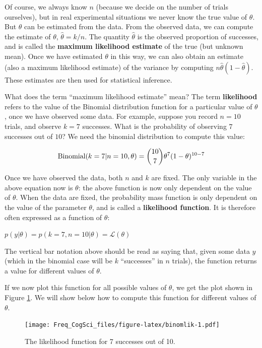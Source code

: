 \documentclass[
  12pt,
]{krantz}
\theoremstyle{definition}
\theoremstyle{definition}
\theoremstyle{definition}
\theoremstyle{definition}
\theoremstyle{remark}
\begin{document}
Of course, we always know \(n\) (because we decide on the number of trials ourselves), but in real experimental situations we never know the true value of \(\theta\). But \(\theta\) can be estimated from the data. From the observed data, we can compute the estimate of \(\theta\), \(\hat \theta=k/n\). The quantity \(\hat \theta\) is the observed proportion of successes, and is called the \textbf{maximum likelihood estimate} of the true (but unknown mean). Once we have estimated \(\theta\) in this way, we can also obtain an estimate (also a maximum likelihood estimate) of the variance by computing \(n\hat\theta (1-\hat\theta)\). These estimates are then used for statistical inference.

What does the term ``maximum likelihood estimate'' mean? The term \textbf{likelihood} refers to the value of the Binomial distribution function for a particular value of \(\theta\), once we have observed some data. For example, suppose you record \(n=10\) trials, and observe \(k=7\) successes. What is the probability of observing \(7\) successes out of \(10\)? We need the binomial distribution to compute this value:

\begin{equation}
\hbox{Binomial}(k=7|n=10,\theta) = 
\binom{10}{7} \theta^{7} (1-\theta)^{10-7}
\end{equation}

Once we have observed the data, both \(n\) and \(k\) are fixed. The only variable in the above equation now is \(\theta\): the above function is now only dependent on the value of \(\theta\). When the data are fixed, the probability mass function is only dependent on the value of the parameter \(\theta\), and is called a \textbf{likelihood function}. It is therefore often expressed as a function of \(\theta\):

\(p( y | \theta ) = p( k=7, n=10 | \theta) = \mathcal{L}(\theta)\)

The vertical bar notation above should be read as saying that, given some data \(y\) (which in the binomial case will be \(k\) ``successes'' in \(n\) trials), the function returns a value for different values of \(\theta\).

If we now plot this function for all possible values of \(\theta\), we get the plot shown in Figure \ref{fig:binomlik}. We will show below how to compute this function for different values of \(\theta\).

\begin{figure}
\centering
\texttt{[image: Freq\_CogSci\_files/figure-latex/binomlik-1.pdf]}
\caption{\label{fig:binomlik}The likelihood function for 7 successes out of 10.}
\end{figure}
\end{document}
